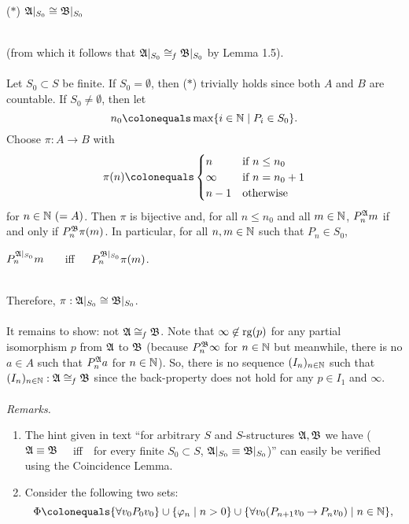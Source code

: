 \begin{enumerate}[1.]
\begin{quoteno}{($\ast$)}
${\mathfrak{A}|_{S_0}} \cong {\mathfrak{B}|_{S_0}}$
\end{quoteno}\smallskip\\
(from which it follows that ${\mathfrak{A}|_{S_0}} \cong_\mathit{f} {\mathfrak{B}|_{S_0}}$ by Lemma 1.5).\\
\ \\
Let $S_0 \subset S$ be finite. If $S_0 = \emptyset$, then ($\ast$) trivially holds since both $A$ and $B$ are countable. If $S_0 \neq \emptyset$, then let
\[
n_0 \colonequals \max \setm{i \in \nat}{P_i \in S_0}.
\]
Choose $\pi : A \to B$ with
\[
\pi(n) \colonequals \begin{cases}
n      & \mbox{if \(n \leq n_0\)} \cr
\infty & \mbox{if \(n = n_0 + 1\)} \cr
n - 1  & \mbox{otherwise}
\end{cases}
\]
for $n \in \mathbb{N} \ (= A)$. Then $\pi$ is bijective and, for all $n \leq n_0$ and all $m \in \mathbb{N}$, $P_n^{\mathfrak{A}} m$ if and only if $P_n^{\mathfrak{B}} \pi(m)$. In particular, for all $n, m \in \mathbb{N}$ such that $P_n \in S_0$,\\
\centerline{$P_n^{\mathfrak{A}|_{S_0}} m$ \ \ \ iff\ \ \ $P_n^{\mathfrak{B}|_{S_0}} \pi(m)$.}\\
Therefore, $\pi : {\mathfrak{A}|_{S_0}} \cong {\mathfrak{B}|_{S_0}}$.\\
\ \\
It remains to show: not $\mathfrak{A} \cong_\mathit{f} \mathfrak{B}$. Note that $\infty \not\in {\mathrm{rg}(p)}$ for any partial isomorphism $p$ from $\mathfrak{A}$ to $\mathfrak{B}$ (because $P^{\mathfrak{B}}_n \infty$ for $n \in \mathbb{N}$ but meanwhile, there is no $a \in A$ such that $P^{\mathfrak{A}}_n a$ for $n \in \mathbb{N}$). So, there is no sequence $(I_n)_{n \in \mathbb{N}}$ such that $(I_n)_{n \in \mathbb{N}}: \mathfrak{A} \cong_\mathit{f} \mathfrak{B}$ since the back-property does not hold for any $p \in I_1$ and $\infty$.\\
\ \\
\textit{Remarks.}
\begin{enumerate}[(1)]
\item The hint given in text ``for arbitrary $S$ and $S$-structures $\mathfrak{A}, \mathfrak{B}$ we have ($\mathfrak{A} \equiv \mathfrak{B}$ \ \ iff\ \ for every finite $S_0 \subset S$, ${\mathfrak{A}|_{S_0}} \equiv {\mathfrak{B}|_{S_0}}$)'' can easily be verified using the Coincidence Lemma.
\item Consider the following two sets:
\[
\Phi \colonequals \{ \forall v_0 P_0 v_0 \} \cup \setm{\varphi_n}{n > 0} \cup \setm{\forall v_0 (P_{n + 1} v_0 \limply P_n v_0)}{n \in \nat},
\]
\end{enumerate}
\end{enumerate}
